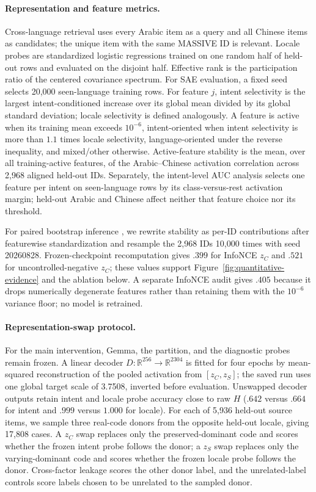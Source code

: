 \documentclass[11pt]{article}
\begin{document}
\paragraph{Representation and feature metrics.}
Cross-language retrieval uses every Arabic item as a query and all Chinese items as candidates; the unique item with the same MASSIVE ID is relevant. Locale probes are standardized logistic regressions trained on one random half of held-out rows and evaluated on the disjoint half. Effective rank is the participation ratio of the centered covariance spectrum. For SAE evaluation, a fixed seed selects 20,000 seen-language training rows. For feature $j$, intent selectivity is the largest intent-conditioned increase over its global mean divided by its global standard deviation; locale selectivity is defined analogously. A feature is active when its training mean exceeds $10^{-6}$, intent-oriented when intent selectivity is more than $1.1$ times locale selectivity, language-oriented under the reverse inequality, and mixed/other otherwise. Active-feature stability is the mean, over all training-active features, of the Arabic--Chinese activation correlation across 2,968 aligned held-out IDs. Separately, the intent-level AUC analysis selects one feature per intent on seen-language rows by its class-versus-rest activation margin; held-out Arabic and Chinese affect neither that feature choice nor its threshold.

For paired bootstrap inference \citep{efron1993bootstrap}, we rewrite stability as per-ID contributions after featurewise standardization and resample the 2,968 IDs 10,000 times with seed 20260828. Frozen-checkpoint recomputation gives $.399$ for InfoNCE $z_C$ and $.521$ for uncontrolled-negative $z_C$; these values support Figure~\ref{fig:quantitative-evidence} and the ablation below. A separate InfoNCE audit gives $.405$ because it drops numerically degenerate features rather than retaining them with the $10^{-6}$ variance floor; no model is retrained.

\paragraph{Representation-swap protocol.}
For the main intervention, Gemma, the partition, and the diagnostic probes remain frozen. A linear decoder $D:\mathbb{R}^{256}\rightarrow\mathbb{R}^{2304}$ is fitted for four epochs by mean-squared reconstruction of the pooled activation from $[z_C,z_S]$; the saved run uses one global target scale of 3.7508, inverted before evaluation. Unswapped decoder outputs retain intent and locale probe accuracy close to raw $H$ ($.642$ versus $.664$ for intent and $.999$ versus $1.000$ for locale). For each of 5,936 held-out source items, we sample three real-code donors from the opposite held-out locale, giving 17,808 cases. A $z_C$ swap replaces only the preserved-dominant code and scores whether the frozen intent probe follows the donor; a $z_S$ swap replaces only the varying-dominant code and scores whether the frozen locale probe follows the donor. Cross-factor leakage scores the other donor label, and the unrelated-label controls score labels chosen to be unrelated to the sampled donor.
\end{document}
